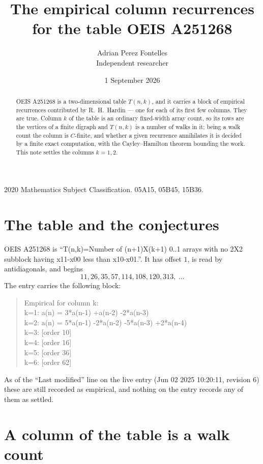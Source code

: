 \documentclass[11pt,a4paper]{article}
\title{The empirical column recurrences for the table OEIS A251268}
\author{Adrian Perez Fontelles\\ \small Independent researcher}
\date{1 September 2026}
\theoremstyle{plain}
\theoremstyle{definition}
\begin{document}
\maketitle

\begin{abstract}
OEIS A251268 is a two-dimensional table $T(n,k)$, and it carries a block of empirical
recurrences contributed by R.~H.~Hardin --- one for each of its first few columns. They are
true. Column $k$ of the table is an ordinary fixed-width array count, so its rows are the
vertices of a finite digraph and $T(n,k)$ is a number of walks in it; being a walk count the
column is $C$-finite, and whether a given recurrence annihilates it is decided by a finite
exact computation, with the Cayley--Hamilton theorem bounding the work. This note settles the
columns $k=1, 2$.
\end{abstract}

\noindent\small 2020 Mathematics Subject Classification. 05A15, 05B45, 15B36.\normalsize

\section{The table and the conjectures}

OEIS A251268 is ``T(n,k)=Number of (n+1)X(k+1) 0..1 arrays with no 2X2 subblock having x11-x00 less than x10-x01.''. It has offset $1$, is
read by antidiagonals, and begins
\[
11, 26, 35, 57, 114, 108, 120, 313,\ \dots
\]
The entry carries the following block:
\begin{quote}\small
Empirical for column k:\\
k=1: a(n) = 3*a(n-1) +a(n-2) -2*a(n-3)\\
k=2: a(n) = 5*a(n-1) -2*a(n-2) -5*a(n-3) +2*a(n-4)\\
k=3: [order 10]\\
k=4: [order 16]\\
k=5: [order 36]\\
k=6: [order 62]\\
\end{quote}
As of the ``Last modified'' line on the live entry (Jun 02 2025 10:20:11, revision 6) these are still
recorded as empirical, and nothing on the entry records any of them as settled.

\section{A column of the table is a walk count}
\end{document}
